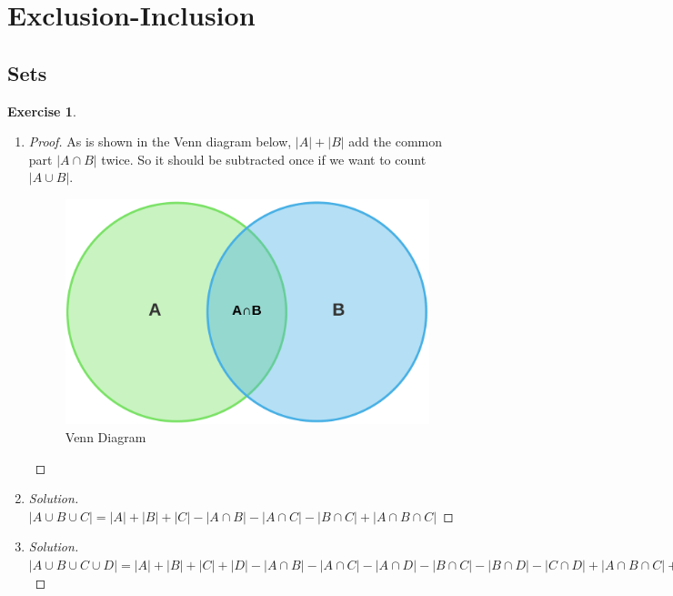 \documentclass[12pt,a4]{article}
\theoremstyle{exercise}
\newtheorem{exercise}[theorem]{Exercise}
\newenvironment{solution}
  {\renewcommand\qedsymbol{$\blacksquare$}\begin{proof}[Solution]}
  {\end{proof}}
\begin{document}
\section{Exclusion-Inclusion}

\subsection{Sets}

\begin{exercise}
\end{exercise}

\begin{enumerate}
\item \begin{proof}
As is shown in the Venn diagram below, $\left\vert{A}\right\vert + \left\vert{B}\right\vert$ add the common part $\left\vert{A\cap B}\right\vert $ twice. So it should be subtracted once if we want to count $\left\vert{A \cup B}\right\vert $.
\begin{figure}[h]
\centering
\includegraphics[scale=0.1]{Venn}
\caption{Venn Diagram}
\end{figure}
\end{proof}
\item \begin{solution}
$\left\vert{A\cup B\cup C}\right\vert = \left\vert{A}\right\vert + \left\vert{B}\right\vert + \left\vert{C}\right\vert - \left\vert{A\cap B}\right\vert - \left\vert{A\cap C}\right\vert - \left\vert{B \cap C}\right\vert + \left\vert{A\cap B \cap C}\right\vert$
\end{solution}
\item \begin{solution}
$\left\vert{A\cup B\cup C \cup D}\right\vert = \left\vert{A}\right\vert + \left\vert{B}\right\vert + \left\vert{C}\right\vert + \left\vert{D}\right\vert - \left\vert{A\cap B}\right\vert - \left\vert{A\cap C}\right\vert - \left\vert{A \cap D}\right\vert - \left\vert{B \cap C}\right\vert - \left\vert{B \cap D}\right\vert - \left\vert{C \cap D}\right\vert + \left\vert{A\cap B \cap C}\right\vert + \left\vert{A\cap B \cap D}\right\vert + \left\vert{A\cap C \cap D}\right\vert + \left\vert{B\cap C \cap D}\right\vert - \left\vert{A\cap B \cap C\cap D}\right\vert$
\end{solution}
\end{enumerate}
\end{document}
